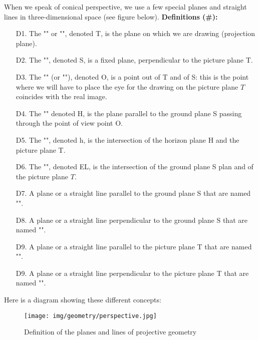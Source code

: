 	When we speak of conical perspective, we use a few special planes and straight lines in three-dimensional space (see figure below).
	\textbf{Definitions (\#\mydef):}
	\begin{enumerate}
		\item[D1.] The "" or "", denoted T, is the plane on which we are drawing (projection plane).

		\item[D2.] The "", denoted S, is a fixed plane, perpendicular to the picture plane T.
	
		\item[D3.] The "" (or ""), denoted O, is a point out of T and of S: this is the point where we will have to place the eye for the drawing on the picture plane $T$ coincides with the real image.
	
		\item[D4.] The "" denoted H, is the plane parallel to the ground plane S passing through the point of view point O.
	
		\item[D5.] The "", denoted h, is the intersection of the horizon plane H and the picture plane T.
		
		\item[D6.] The "", denoted EL, is the intersection of the ground plane S plan and of the picture plane $T$.
		
		\item[D7.] A plane or a straight line parallel to the ground plane S that are named "".
		
		\item[D8.] A plane or a straight line perpendicular to the ground plane S that are named "".
		
		\item[D9.] A plane or a straight line parallel to the picture plane T that are named "".
		
		\item[D9.] A plane or a straight line perpendicular to the picture plane T that are named "".
	\end{enumerate}
	Here is a diagram showing these different concepts:
	\begin{figure}[H]
		\centering
		\texttt{[image: img/geometry/perspective.jpg]}
		\caption{Definition of the planes and lines of projective geometry}
	\end{figure}
	
